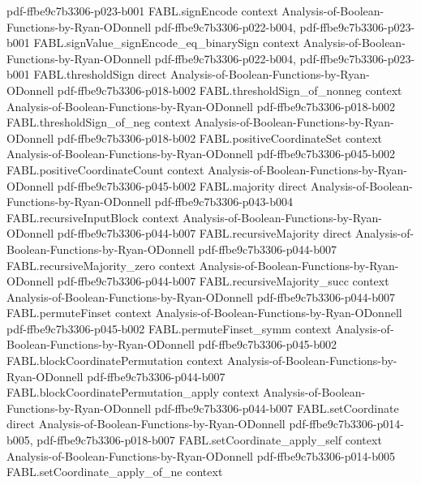 \begin{theorem}
  {pdf-ffbe9c7b3306-p023-b001}
\proofstep
  {FABL.signEncode}
  {context}
  {Analysis-of-Boolean-Functions-by-Ryan-ODonnell}
  {pdf-ffbe9c7b3306-p022-b004,
    pdf-ffbe9c7b3306-p023-b001}
\proofstep
  {FABL.signValue_signEncode_eq_binarySign}
  {context}
  {Analysis-of-Boolean-Functions-by-Ryan-ODonnell}
  {pdf-ffbe9c7b3306-p022-b004,
    pdf-ffbe9c7b3306-p023-b001}
\proofstep
  {FABL.thresholdSign}
  {direct}
  {Analysis-of-Boolean-Functions-by-Ryan-ODonnell}
  {pdf-ffbe9c7b3306-p018-b002}
\proofstep
  {FABL.thresholdSign_of_nonneg}
  {context}
  {Analysis-of-Boolean-Functions-by-Ryan-ODonnell}
  {pdf-ffbe9c7b3306-p018-b002}
\proofstep
  {FABL.thresholdSign_of_neg}
  {context}
  {Analysis-of-Boolean-Functions-by-Ryan-ODonnell}
  {pdf-ffbe9c7b3306-p018-b002}
\proofstep
  {FABL.positiveCoordinateSet}
  {context}
  {Analysis-of-Boolean-Functions-by-Ryan-ODonnell}
  {pdf-ffbe9c7b3306-p045-b002}
\proofstep
  {FABL.positiveCoordinateCount}
  {context}
  {Analysis-of-Boolean-Functions-by-Ryan-ODonnell}
  {pdf-ffbe9c7b3306-p045-b002}
\proofstep
  {FABL.majority}
  {direct}
  {Analysis-of-Boolean-Functions-by-Ryan-ODonnell}
  {pdf-ffbe9c7b3306-p043-b004}
\proofstep
  {FABL.recursiveInputBlock}
  {context}
  {Analysis-of-Boolean-Functions-by-Ryan-ODonnell}
  {pdf-ffbe9c7b3306-p044-b007}
\proofstep
  {FABL.recursiveMajority}
  {direct}
  {Analysis-of-Boolean-Functions-by-Ryan-ODonnell}
  {pdf-ffbe9c7b3306-p044-b007}
\proofstep
  {FABL.recursiveMajority_zero}
  {context}
  {Analysis-of-Boolean-Functions-by-Ryan-ODonnell}
  {pdf-ffbe9c7b3306-p044-b007}
\proofstep
  {FABL.recursiveMajority_succ}
  {context}
  {Analysis-of-Boolean-Functions-by-Ryan-ODonnell}
  {pdf-ffbe9c7b3306-p044-b007}
\proofstep
  {FABL.permuteFinset}
  {context}
  {Analysis-of-Boolean-Functions-by-Ryan-ODonnell}
  {pdf-ffbe9c7b3306-p045-b002}
\proofstep
  {FABL.permuteFinset_symm}
  {context}
  {Analysis-of-Boolean-Functions-by-Ryan-ODonnell}
  {pdf-ffbe9c7b3306-p045-b002}
\proofstep
  {FABL.blockCoordinatePermutation}
  {context}
  {Analysis-of-Boolean-Functions-by-Ryan-ODonnell}
  {pdf-ffbe9c7b3306-p044-b007}
\proofstep
  {FABL.blockCoordinatePermutation_apply}
  {context}
  {Analysis-of-Boolean-Functions-by-Ryan-ODonnell}
  {pdf-ffbe9c7b3306-p044-b007}
\proofstep
  {FABL.setCoordinate}
  {direct}
  {Analysis-of-Boolean-Functions-by-Ryan-ODonnell}
  {pdf-ffbe9c7b3306-p014-b005,
    pdf-ffbe9c7b3306-p018-b007}
\proofstep
  {FABL.setCoordinate_apply_self}
  {context}
  {Analysis-of-Boolean-Functions-by-Ryan-ODonnell}
  {pdf-ffbe9c7b3306-p014-b005}
\proofstep
  {FABL.setCoordinate_apply_of_ne}
  {context}

\end{theorem}
